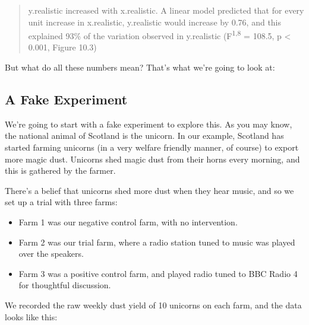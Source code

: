 \documentclass[
]{book}
\begin{document}
\begin{quote}
y.realistic increased with x.realistic. A linear model predicted that for every unit increase in x.realistic, y.realistic would increase by 0.76, and this explained 93\% of the variation observed in y.realistic (F\textsuperscript{1,8} = 108.5, p \textless{} 0.001, Figure 10.3)
\end{quote}

But what do all these numbers mean? That's what we're going to look at:

\hypertarget{a-fake-experiment}{%
\subsection{A Fake Experiment}\label{a-fake-experiment}}

We're going to start with a fake experiment to explore this. As you may know, the national animal of Scotland is the unicorn. In our example, Scotland has started farming unicorns (in a very welfare friendly manner, of course) to export more magic dust. Unicorns shed magic dust from their horns every morning, and this is gathered by the farmer.

There's a belief that unicorns shed more dust when they hear music, and so we set up a trial with three farms:

\begin{itemize}
\item
  Farm 1 was our negative control farm, with no intervention.
\item
  Farm 2 was our trial farm, where a radio station tuned to music was played over the speakers.
\item
  Farm 3 was a positive control farm, and played radio tuned to BBC Radio 4 for thoughtful discussion.
\end{itemize}

We recorded the raw weekly dust yield of 10 unicorns on each farm, and the data looks like this:
\end{document}
